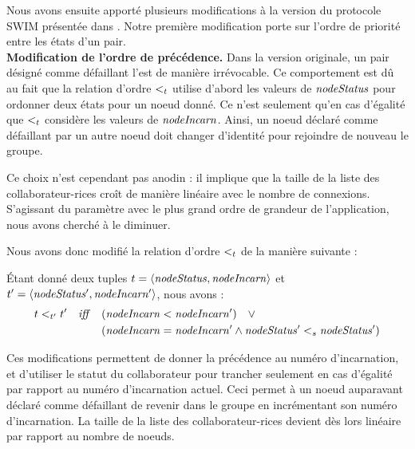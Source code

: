 Nous avons ensuite apporté plusieurs modifications à la version du protocole SWIM présentée dans \cite{swim2002}.
Notre première modification porte sur l'ordre de priorité entre les états d'un pair.\\

\textbf{Modification de l'ordre de précédence.}
Dans la version originale, un pair désigné comme défaillant l'est de manière irrévocable.
Ce comportement est dû au fait que la relation d'ordre $<_{t}$ utilise d'abord les valeurs de $\mathit{nodeStatus}$ pour ordonner deux états pour un noeud donné.
Ce n'est seulement qu'en cas d'égalité que $<_{t}$ considère les valeurs de $\mathit{nodeIncarn}$.
Ainsi, un noeud déclaré comme défaillant par un autre noeud doit changer d'identité pour rejoindre de nouveau le groupe.

Ce choix n'est cependant pas anodin : il implique que la taille de la liste des collaborateur-rices croît de manière linéaire avec le nombre de connexions.
S'agissant du paramètre avec le plus grand ordre de grandeur de l'application, nous avons cherché à le diminuer.

Nous avons donc modifié la relation d'ordre $<_{t}$ de la manière suivante :

\begin{definition}
    Étant donné deux tuples $t = \langle \mathit{nodeStatus},\mathit{nodeIncarn} \rangle$ et $t' = \langle \mathit{nodeStatus'},\mathit{nodeIncarn'} \rangle$, nous avons :
    \begin{equation*}
      \begin{split}
        t <_{t'} t' \quad \mathit{iff} \quad  & (\mathit{nodeIncarn} < \mathit{nodeIncarn'}) \quad \lor \\
                                            & (\mathit{nodeIncarn} = \mathit{nodeIncarn'} \land \mathit{nodeStatus'} <_{s} \mathit{nodeStatus'}) \\
      \end{split}
    \end{equation*}
  \end{definition}

Ces modifications permettent de donner la précédence au numéro d'incarnation, et d'utiliser le statut du collaborateur pour trancher seulement en cas d'égalité par rapport au numéro d'incarnation actuel.
Ceci permet à un noeud auparavant déclaré comme défaillant de revenir dans le groupe en incrémentant son numéro d'incarnation.
La taille de la liste des collaborateur-rices devient dès lors linéaire par rapport au nombre de noeuds.

